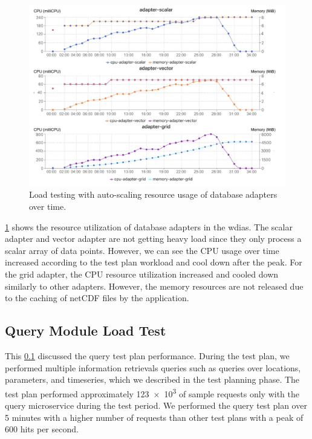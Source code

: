 \begin{figure}[htp]
    \centering
    \includegraphics[width=1.0\textwidth]{results/obs/all_auto/obs_all_auto_15m_adapter_dbs_res.pdf}
    \caption{Load testing with auto-scaling resource usage of database adapters over time.}
    \label{fi:obs_all_auto_15m_adapter_dbs_res}
\end{figure}

\cref{fi:obs_all_auto_15m_adapter_dbs_res} shows the resource utilization of database adapters in the \acrshort{wdias}. The scalar adapter and vector adapter are not getting heavy load since they only process a scalar array of data points. However, we can see the CPU usage over time increased according to the test plan workload and cool down after the peak. For the grid adapter, the CPU resource utilization increased and cooled down similarly to other adapters. However, the memory resources are not released due to the caching of netCDF files by the application.

\subsection{Query Module Load Test}
\label{subse:obs_test_plan_query_15min}

This \cref{subse:obs_test_plan_query_15min} discussed the query test plan performance. During the test plan, we performed multiple information retrievals queries such as queries over locations, parameters, and timeseries, which we described in the test planning phase. The test plan performed approximately \num{123e3} of sample requests only with the query microservice during the test period. We performed the query test plan over 5 minutes with a higher number of requests than other test plans with a peak of 600 hits per second.

